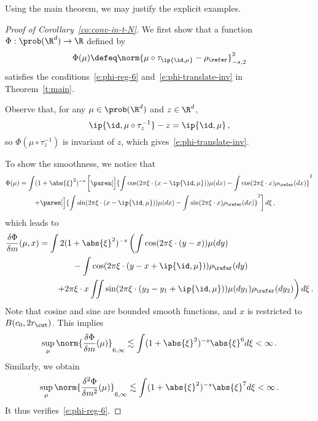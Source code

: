 \documentclass{amsart}
\begin{document}
Using the main theorem, we may justify the explicit examples.
\begin{proof}[Proof of Corollary~\ref{co:conv-in-t-N}]
    We first show that a function $\Phi: \prob(\R^d) \to \R$ defined by 
    \begin{equation*}
        \Phi(\mu) \defeq \norm{\mu \circ \tau_{\ip{\id,\mu}} - \rho_\refer}_{-s,2}^2 
    \end{equation*}
    satisfies the conditions~\eqref{e:phi-reg-6} and~\eqref{e:phi-translate-inv} in Theorem~\ref{t:main}.

    Observe that, for any $\mu \in \prob(\R^d)$ and $z \in \R^d$,
    \begin{equation*}
        \ip{\id, \mu \circ \tau_z^{-1}} - z = \ip{\id, \mu} \,,
    \end{equation*}
    so $\Phi(\mu \circ \tau_z^{-1})$ is invariant of $z$, which gives~\eqref{e:phi-translate-inv}.

    To show the smoothness, we notice that 
    \begin{align*}
        \Phi(\mu) & = \int (1+\abs{\xi}^2)^{-s} \left[ \paren[\Big]{ \int \cos(2\pi \xi \cdot (x - \ip{\id, \mu})) \mu(dx) - \int \cos(2\pi \xi \cdot x) \rho_\refer(dx) }^2 \right. \\
        & \qquad \left. + \paren[\Big]{ \int \sin(2\pi \xi \cdot (x - \ip{\id, \mu})) \mu(dx) - \int \sin(2\pi \xi \cdot x) \rho_\refer(dx) }^2  \right] d\xi \,,
    \end{align*}
    which leads to 
    \begin{align*}
        \frac{\delta \Phi}{\delta m}(\mu,x) & = \int 2(1+\abs{\xi}^2)^{-s} \left( \int \cos(2\pi \xi \cdot (y-x)) \mu(dy) \right. \\
        & \qquad \qquad - \int \cos(2 \pi \xi \cdot (y-x+\ip{\id, \mu})) \rho_\refer(dy) \\
        & \qquad \left. + 2\pi \xi \cdot x \iint \sin(2\pi\xi \cdot (y_2-y_1+\ip{\id, \mu})) \mu(dy_1) \rho_\refer(dy_2) \right) d\xi \,.
    \end{align*}
    Note that cosine and sine are bounded smooth functions, and $x$ is restricted to $B(c_0, 2r_\cut)$. 
    This implies
    \begin{equation*}
        \sup_\mu \norm{\frac{\delta \Phi}{\delta m}(\mu)}_{6,\infty} \lesssim \int (1+\abs{\xi}^2)^{-s} \abs{\xi}^6 d\xi < \infty \,.
    \end{equation*}
    Similarly, we obtain 
    \begin{equation*}
        \sup_\mu \norm{\frac{\delta^2 \Phi}{\delta m^2}(\mu)}_{6,\infty} \lesssim \int (1+\abs{\xi}^2)^{-s} \abs{\xi}^7 d\xi < \infty \,.
    \end{equation*}
    It thus verifies~\eqref{e:phi-reg-6}.
    

\end{proof}
\end{document}

